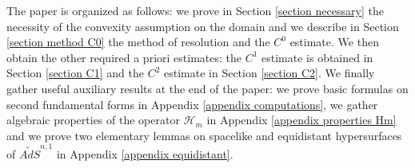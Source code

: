 \documentclass[10pt,reqno,oneside]{amsart}
\theoremstyle{definition}
\theoremstyle{remark}
\begin{document}
The paper is organized as follows: we prove in Section \ref{section necessary} the necessity of the convexity assumption on the domain and we describe in Section \ref{section method C0} the method of resolution and the $C^0$ estimate. We then obtain the other required a priori estimates: the $C^1$ estimate is obtained in Section \ref{section C1} and the $C^2$ estimate in Section \ref{section C2}. We finally gather useful auxiliary results at the end of the paper: we prove basic formulas on second fundamental forms in Appendix \ref{appendix computations}, we gather algebraic properties of the operator $\mathcal{H}_m$ in Appendix \ref{appendix properties Hm} and we prove two elementary lemmas on spacelike and equidistant hypersurfaces of $\widetilde{AdS}^{n,1}$ in Appendix \ref{appendix equidistant}.

\end{document}
